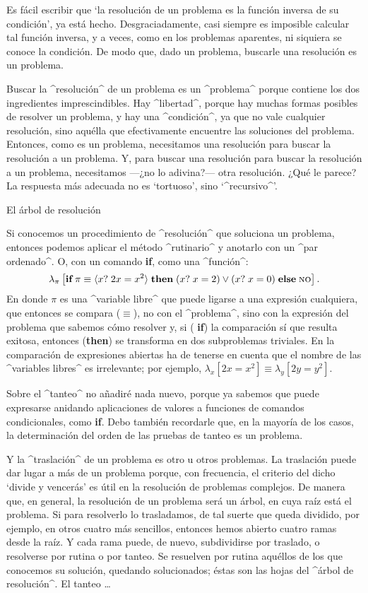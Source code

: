 Es fácil escribir que `la resolución de un problema es la función
inversa de su condición', ya está hecho. Desgraciadamente, casi siempre
es imposible calcular tal función inversa, y a veces, como en los
problemas aparentes, ni siquiera se conoce la condición. De modo que,
dado un problema, buscarle una resolución es un problema.

Buscar la ^resolución^ de un problema es un ^problema^ porque contiene
los dos ingredientes imprescindibles. Hay ^libertad^, porque hay muchas
formas posibles de resolver un problema, y hay una ^condición^, ya que
no vale cualquier resolución, sino aquélla que efectivamente encuentre
las soluciones del problema. Entonces, como es un problema, necesitamos
una resolución para buscar la resolución a un problema. Y, para buscar
una resolución para buscar la resolución a un problema, necesitamos
---¿no lo adivina?--- otra resolución. ¿Qué le parece? La respuesta más
adecuada no es `tortuoso', sino `^recursivo^'.


\Section El árbol de resolución

Si conocemos un procedimiento de ^resolución^ que soluciona un problema,
entonces podemos aplicar el método ^rutinario^ y anotarlo con un ^par
ordenado^. O, con un comando {\bf if}, como una ^función^:
 $$\lambda_\pi \left[ \hbox{\bf if}\;
  \pi \equiv \langle x?\; 2x=x^2 \rangle
  \;\hbox{\bf then}\; (x?\; x=2) \lor (x?\; x=0)
  \;\hbox{\bf else}\; \hbox{\sc no} \right] .$$
En donde $\pi$ es una ^variable libre^ que puede ligarse a una expresión
cualquiera, que entonces se compara ($\equiv$), no con el ^problema^,
sino con la expresión del problema que sabemos cómo resolver y, si ({\bf
if}) la comparación {\sc sí} que resulta exitosa, entonces ({\bf then})
se transforma en dos subproblemas triviales. En la comparación de
expresiones abiertas ha de tenerse en cuenta que el nombre de las
^variables libres^ es irrelevante; por ejemplo,
 $\lambda_x [2x=x^2] \equiv \lambda_y [2y=y^2]$.

Sobre el ^tanteo^ no añadiré nada nuevo, porque ya sabemos que puede
expresarse anidando aplicaciones de valores a funciones de comandos
condicionales, como {\bf if}. Debo también recordarle que, en la mayoría
de los casos, la determinación del orden de las pruebas de tanteo es un
problema.

Y la ^traslación^ de un problema es otro u otros problemas. La
traslación puede dar lugar a más de un problema porque, con frecuencia,
el criterio del dicho `divide y vencerás' es útil en la resolución de
problemas complejos. De manera que, en general, la resolución de un
problema será un árbol, en cuya raíz está el problema. Si para
resolverlo lo trasladamos, de tal suerte que queda dividido, por
ejemplo, en otros cuatro más sencillos, entonces hemos abierto cuatro
ramas desde la raíz. Y cada rama puede, de nuevo, subdividirse por
traslado, o resolverse por rutina o por tanteo. Se resuelven por rutina
aquéllos de los que conocemos su solución, quedando solucionados; éstas
son las hojas del ^árbol de resolución^. El tanteo \dots

